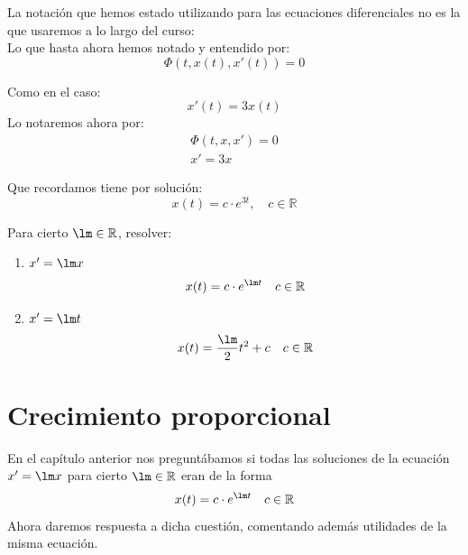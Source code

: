 \begin{notacion}
    La notación que hemos estado utilizando para las ecuaciones diferenciales no es la que usaremos a lo largo del curso:\\

    Lo que hasta ahora hemos notado y entendido por:
    \begin{equation*}
        \Phi(t,x(t),x'(t)) = 0
    \end{equation*}

    Como en el caso:
    \begin{equation*}
      x'(t) = 3x(t)  
    \end{equation*}
    Lo notaremos ahora por:
    \begin{gather*}
        \Phi(t,x,x') = 0\\
        x' = 3x
    \end{gather*}

    Que recordamos tiene por solución:
    \begin{equation*}
        x(t) = c \cdot e^{3t}, \quad c \in \mathbb{R}
    \end{equation*}
\end{notacion}

\begin{ejemplo}
    Para cierto $\lm \in \mathbb{R}$, resolver:
    \begin{enumerate}
        \item $x' = \lm x$
            \begin{equation*}
                x(t) = c \cdot e^{\lm t} \quad c \in \mathbb{R}
            \end{equation*}
        \item $x' = \lm t$
            \begin{equation*}
                x(t) = \frac{\lm}{2} t^2 + c \quad c \in \mathbb{R}
            \end{equation*}
    \end{enumerate}
\end{ejemplo}

\section{Crecimiento proporcional}


En el capítulo anterior nos preguntábamos si todas las soluciones de la ecuación $x'=\lm x$ para cierto $\lm \in \mathbb{R}$ eran de la forma
\begin{equation*}
    x(t) = c \cdot e^{\lm t} \quad c\in \mathbb{R}
\end{equation*}
Ahora daremos respuesta a dicha cuestión, comentando además utilidades de la misma ecuación.

